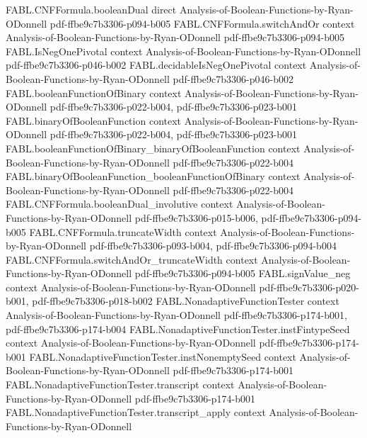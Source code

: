 \begin{theorem}
\proofstep
  {FABL.CNFFormula.booleanDual}
  {direct}
  {Analysis-of-Boolean-Functions-by-Ryan-ODonnell}
  {pdf-ffbe9c7b3306-p094-b005}
\proofstep
  {FABL.CNFFormula.switchAndOr}
  {context}
  {Analysis-of-Boolean-Functions-by-Ryan-ODonnell}
  {pdf-ffbe9c7b3306-p094-b005}
\proofstep
  {FABL.IsNegOnePivotal}
  {context}
  {Analysis-of-Boolean-Functions-by-Ryan-ODonnell}
  {pdf-ffbe9c7b3306-p046-b002}
\proofstep
  {FABL.decidableIsNegOnePivotal}
  {context}
  {Analysis-of-Boolean-Functions-by-Ryan-ODonnell}
  {pdf-ffbe9c7b3306-p046-b002}
\proofstep
  {FABL.booleanFunctionOfBinary}
  {context}
  {Analysis-of-Boolean-Functions-by-Ryan-ODonnell}
  {pdf-ffbe9c7b3306-p022-b004,
    pdf-ffbe9c7b3306-p023-b001}
\proofstep
  {FABL.binaryOfBooleanFunction}
  {context}
  {Analysis-of-Boolean-Functions-by-Ryan-ODonnell}
  {pdf-ffbe9c7b3306-p022-b004,
    pdf-ffbe9c7b3306-p023-b001}
\proofstep
  {FABL.booleanFunctionOfBinary_binaryOfBooleanFunction}
  {context}
  {Analysis-of-Boolean-Functions-by-Ryan-ODonnell}
  {pdf-ffbe9c7b3306-p022-b004}
\proofstep
  {FABL.binaryOfBooleanFunction_booleanFunctionOfBinary}
  {context}
  {Analysis-of-Boolean-Functions-by-Ryan-ODonnell}
  {pdf-ffbe9c7b3306-p022-b004}
\proofstep
  {FABL.CNFFormula.booleanDual_involutive}
  {context}
  {Analysis-of-Boolean-Functions-by-Ryan-ODonnell}
  {pdf-ffbe9c7b3306-p015-b006,
    pdf-ffbe9c7b3306-p094-b005}
\proofstep
  {FABL.CNFFormula.truncateWidth}
  {context}
  {Analysis-of-Boolean-Functions-by-Ryan-ODonnell}
  {pdf-ffbe9c7b3306-p093-b004,
    pdf-ffbe9c7b3306-p094-b004}
\proofstep
  {FABL.CNFFormula.switchAndOr_truncateWidth}
  {context}
  {Analysis-of-Boolean-Functions-by-Ryan-ODonnell}
  {pdf-ffbe9c7b3306-p094-b005}
\proofstep
  {FABL.signValue_neg}
  {context}
  {Analysis-of-Boolean-Functions-by-Ryan-ODonnell}
  {pdf-ffbe9c7b3306-p020-b001,
    pdf-ffbe9c7b3306-p018-b002}
\proofstep
  {FABL.NonadaptiveFunctionTester}
  {context}
  {Analysis-of-Boolean-Functions-by-Ryan-ODonnell}
  {pdf-ffbe9c7b3306-p174-b001,
    pdf-ffbe9c7b3306-p174-b004}
\proofstep
  {FABL.NonadaptiveFunctionTester.instFintypeSeed}
  {context}
  {Analysis-of-Boolean-Functions-by-Ryan-ODonnell}
  {pdf-ffbe9c7b3306-p174-b001}
\proofstep
  {FABL.NonadaptiveFunctionTester.instNonemptySeed}
  {context}
  {Analysis-of-Boolean-Functions-by-Ryan-ODonnell}
  {pdf-ffbe9c7b3306-p174-b001}
\proofstep
  {FABL.NonadaptiveFunctionTester.transcript}
  {context}
  {Analysis-of-Boolean-Functions-by-Ryan-ODonnell}
  {pdf-ffbe9c7b3306-p174-b001}
\proofstep
  {FABL.NonadaptiveFunctionTester.transcript_apply}
  {context}
  {Analysis-of-Boolean-Functions-by-Ryan-ODonnell}

\end{theorem}
